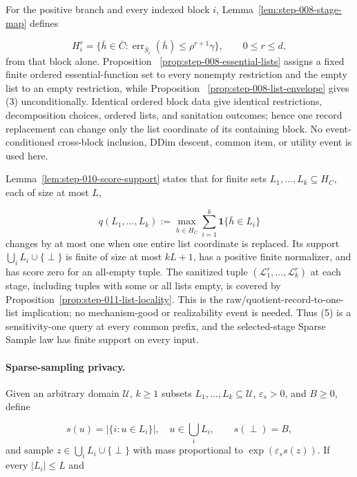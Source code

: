 \noindent For the positive branch and every indexed block \(i\),
  Lemma~\ref{lem:step-008-stage-map} defines

  \[
    H_i^r
    =\{\bar h\in\bar C:
       \operatorname{err}_{\bar S_i}(\bar h)
       \leq \rho^{r+1}\gamma\},
    \qquad 0\leq r\leq d,
  \tag{4}
  \]
  from that block alone. Proposition
  ~\ref{prop:step-008-essential-lists} assigns a fixed finite ordered
  essential-function set to every nonempty restriction and the empty list to
  an empty restriction, while Proposition
  ~\ref{prop:step-008-list-envelope} gives (3) unconditionally. Identical
  ordered block data give identical restrictions, decomposition choices,
  ordered lists, and sanitation outcomes; hence one record replacement can
  change only the list coordinate of its containing block. No
  event-conditioned cross-block inclusion, DDim descent, common item, or
  utility event is used here.

\noindent Lemma~\ref{lem:step-010-score-support} states that for finite sets
  \(L_1,\ldots,L_k\subseteq H_C\), each of size at most \(L\),

  \[
    q(L_1,\ldots,L_k)
    :=\max_{\bar h\in H_C}
      \sum_{i=1}^k\mathbf 1\{\bar h\in L_i\}
  \tag{5}
  \]
  changes by at most one when one entire list coordinate is replaced. Its
  support \(\bigcup_iL_i\cup\{\perp\}\) is finite of size at most \(kL+1\),
  has a positive finite normalizer, and has score zero for an all-empty tuple.
  The sanitized tuple
  \((\mathcal L_1^r,\ldots,\mathcal L_k^r)\) at each stage, including tuples
  with some or all lists empty, is covered by
  Proposition~\ref{prop:step-011-list-locality}. This is the
  raw/quotient-record-to-one-list implication; no mechanism-good or
  realizability event is needed. Thus (5) is a sensitivity-one query at every
  common prefix, and the selected-stage Sparse Sample law has finite support
  on every input.

\paragraph{Sparse-sampling privacy.}

\noindent Given an arbitrary domain
  \(\mathcal U\), \(k\geq1\) subsets
  \(L_1,\ldots,L_k\subseteq\mathcal U\), \(\varepsilon_s>0\), and \(B\geq0\),
  define

  \[
    s(u)=|\{i:u\in L_i\}|,
    \quad u\in\bigcup_iL_i,
    \qquad s(\perp)=B,
  \]
  and sample \(z\in\bigcup_iL_i\cup\{\perp\}\) with mass proportional to
  \(\exp(\varepsilon_s s(z))\). If every \(|L_i|\leq L\) and

